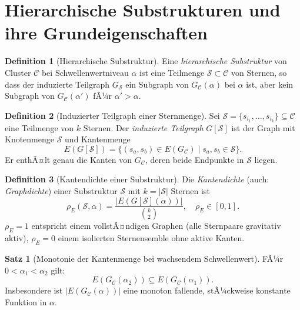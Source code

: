 ﻿\documentclass[a4paper,12pt]{report}
\theoremstyle{definition}
\newtheorem{definition}{Definition}
\newtheorem{satz}{Satz}
\begin{document}
\section{Hierarchische Substrukturen und ihre Grundeigenschaften}
\label{sec:hier_grundlagen}

\begin{definition}[Hierarchische Substruktur]
\label{def:hier_substru}
Eine \emph{hierarchische Substruktur} von Cluster $\mathcal{C}$ bei Schwellenwertniveau $\alpha$ ist eine Teilmenge $\mathcal{S} \subset \mathcal{C}$ von Sternen, so dass der induzierte Teilgraph $G_\mathcal{S}$ ein Subgraph von $G_\mathcal{C}(\alpha)$ bei $\alpha$ ist, aber kein Subgraph von $G_\mathcal{C}(\alpha')$ fÃ¼r $\alpha' > \alpha$.
\end{definition}

\begin{definition}[Induzierter Teilgraph einer Sternmenge]
\label{def:induziertergraph}
Sei $\mathcal{S} = \{s_{i_1}, \ldots, s_{i_k}\} \subseteq \mathcal{C}$ eine Teilmenge von $k$ Sternen. Der \emph{induzierte Teilgraph} $G[\mathcal{S}]$ ist der Graph mit Knotenmenge $\mathcal{S}$ und Kantenmenge
\[
E(G[\mathcal{S}]) = \{(s_a, s_b) \in E(G_\mathcal{C}) \mid s_a, s_b \in \mathcal{S}\}.
\]
Er enthÃ¤lt genau die Kanten von $G_\mathcal{C}$, deren beide Endpunkte in $\mathcal{S}$ liegen.
\end{definition}

\begin{definition}[Kantendichte einer Substruktur]
\label{def:kantendichte}
Die \emph{Kantendichte} (auch: \emph{Graphdichte}) einer Substruktur $\mathcal{S}$ mit $k = |\mathcal{S}|$ Sternen ist
\[
\rho_E(\mathcal{S}, \alpha) = \frac{|E(G[\mathcal{S}](\alpha))|}{\binom{k}{2}}, \quad \rho_E \in [0, 1].
\]
$\rho_E = 1$ entspricht einem vollstÃ¤ndigen Graphen (alle Sternpaare gravitativ aktiv), $\rho_E = 0$ einem isolierten Sternensemble ohne aktive Kanten.
\end{definition}

\begin{satz}[Monotonie der Kantenmenge bei wachsendem Schwellenwert]
\label{satz:monotonie_kanten}
FÃ¼r $0 < \alpha_1 < \alpha_2$ gilt:
\[
E(G_\mathcal{C}(\alpha_2)) \subseteq E(G_\mathcal{C}(\alpha_1)).
\]
Insbesondere ist $|E(G_\mathcal{C}(\alpha))|$ eine monoton fallende, stÃ¼ckweise konstante Funktion in $\alpha$.
\end{satz}
\end{document}
